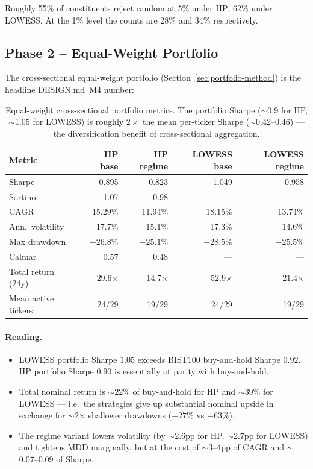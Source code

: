 \documentclass[11pt,a4paper]{article}
\begin{document}
Roughly 55\% of constituents reject random at 5\% under HP; 62\% under LOWESS.
At the 1\% level the counts are 28\% and 34\% respectively.

\subsection{Phase 2 -- Equal-Weight Portfolio}\label{sec:portfolio-results}

The cross-sectional equal-weight portfolio (Section~\ref{sec:portfolio-method})
is the headline DESIGN.md~M4 number:

\begin{table}[h]
\centering
\begin{tabular}{@{}lrrrr@{}}
\toprule
\textbf{Metric} & \textbf{HP base} & \textbf{HP regime} & \textbf{LOWESS base} & \textbf{LOWESS regime} \\
\midrule
Sharpe              & 0.895 & 0.823 & 1.049 & 0.958 \\
Sortino             & 1.07  & 0.98  & ---   & ---   \\
CAGR                & 15.29\% & 11.94\% & 18.15\% & 13.74\% \\
Ann.~volatility     & 17.7\% & 15.1\% & 17.3\% & 14.6\% \\
Max drawdown        & $-26.8\%$ & $-25.1\%$ & $-28.5\%$ & $-25.5\%$ \\
Calmar              & 0.57  & 0.48  & --- & --- \\
Total return (24y)  & 29.6$\times$ & 14.7$\times$ & 52.9$\times$ & 21.4$\times$ \\
Mean active tickers & 24/29 & 19/29 & 24/29 & 19/29 \\
\bottomrule
\end{tabular}
\caption{Equal-weight cross-sectional portfolio metrics. The portfolio Sharpe
($\sim$0.9 for HP, $\sim$1.05 for LOWESS) is roughly $2\times$ the mean
per-ticker Sharpe ($\sim$0.42--0.46) --- the diversification benefit of
cross-sectional aggregation.}
\end{table}

\paragraph{Reading.}
\begin{itemize}[leftmargin=1.5em,itemsep=2pt]
    \item LOWESS portfolio Sharpe $1.05$ exceeds BIST100 buy-and-hold Sharpe
          $0.92$. HP portfolio Sharpe $0.90$ is essentially at parity with
          buy-and-hold.
    \item Total nominal return is $\sim$22\% of buy-and-hold for HP and
          $\sim$39\% for LOWESS --- i.e.\ the strategies give up substantial
          nominal upside in exchange for $\sim$2$\times$ shallower drawdowns
          ($-27\%$ vs $-63\%$).
    \item The regime variant lowers volatility (by $\sim$2.6pp for HP,
          $\sim$2.7pp for LOWESS) and tightens MDD marginally, but at the cost
          of $\sim$3--4pp of CAGR and $\sim$0.07--0.09 of Sharpe.
\end{itemize}
\end{document}
